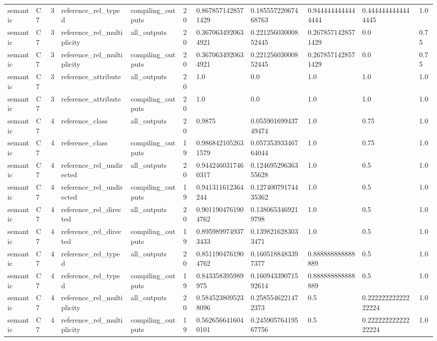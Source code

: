 \begin{tabular}{lllllllllll}
semantic & C7 & 3 & reference\_rel\_typed & compiling\_outputs & 20 & 0.8678571428571429 & 0.18555722067468763 & 0.9444444444444444 & 0.4444444444444445 & 1.0 \\
semantic & C7 & 3 & reference\_rel\_multiplicity & all\_outputs & 20 & 0.3670634920634921 & 0.22125603000852445 & 0.2678571428571429 & 0.0 & 0.75 \\
semantic & C7 & 3 & reference\_rel\_multiplicity & compiling\_outputs & 20 & 0.3670634920634921 & 0.22125603000852445 & 0.2678571428571429 & 0.0 & 0.75 \\
semantic & C7 & 3 & reference\_attribute & all\_outputs & 20 & 1.0 & 0.0 & 1.0 & 1.0 & 1.0 \\
semantic & C7 & 3 & reference\_attribute & compiling\_outputs & 20 & 1.0 & 0.0 & 1.0 & 1.0 & 1.0 \\
semantic & C7 & 4 & reference\_class & all\_outputs & 20 & 0.9875 & 0.05590169943749474 & 1.0 & 0.75 & 1.0 \\
semantic & C7 & 4 & reference\_class & compiling\_outputs & 19 & 0.9868421052631579 & 0.05735393346764044 & 1.0 & 0.75 & 1.0 \\
semantic & C7 & 4 & reference\_rel\_undirected & all\_outputs & 20 & 0.9442460317460317 & 0.12469529636355628 & 1.0 & 0.5 & 1.0 \\
semantic & C7 & 4 & reference\_rel\_undirected & compiling\_outputs & 19 & 0.941311612364244 & 0.12740079174435362 & 1.0 & 0.5 & 1.0 \\
semantic & C7 & 4 & reference\_rel\_directed & all\_outputs & 20 & 0.9011904761904762 & 0.1380653469219798 & 1.0 & 0.5 & 1.0 \\
semantic & C7 & 4 & reference\_rel\_directed & compiling\_outputs & 19 & 0.8959899749373433 & 0.1398216283033471 & 1.0 & 0.5 & 1.0 \\
semantic & C7 & 4 & reference\_rel\_typed & all\_outputs & 20 & 0.8511904761904762 & 0.1605188483397377 & 0.888888888888889 & 0.5 & 1.0 \\
semantic & C7 & 4 & reference\_rel\_typed & compiling\_outputs & 19 & 0.843358395989975 & 0.16094339071592614 & 0.888888888888889 & 0.5 & 1.0 \\
semantic & C7 & 4 & reference\_rel\_multiplicity & all\_outputs & 20 & 0.5845238095238096 & 0.2585546221472373 & 0.5 & 0.22222222222222224 & 1.0 \\
semantic & C7 & 4 & reference\_rel\_multiplicity & compiling\_outputs & 19 & 0.5626566416040101 & 0.24590576419567756 & 0.5 & 0.22222222222222224 & 1.0 \\

\end{tabular}

